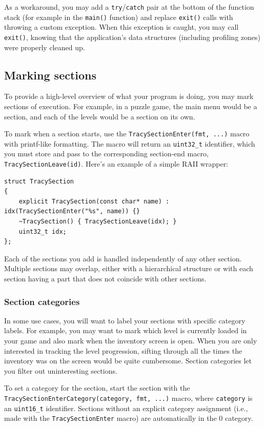\documentclass[hidelinks,titlepage,a4paper,twoside]{article}
\begin{document}
As a workaround, you may add a \texttt{try}/\texttt{catch} pair at the bottom of the function stack (for example in the \texttt{main()} function) and replace \texttt{exit()} calls with throwing a custom exception. When this exception is caught, you may call \texttt{exit()}, knowing that the application's data structures (including profiling zones) were properly cleaned up.

\subsection{Marking sections}
\label{markingsections}

To provide a high-level overview of what your program is doing, you may mark sections of execution. For example, in a puzzle game, the main menu would be a section, and each of the levels would be a section on its own.

To mark when a section starts, use the \texttt{TracySectionEnter(fmt, ...)} macro with printf-like formatting. The macro will return an \texttt{uint32\_t} identifier, which you must store and pass to the corresponding section-end macro, \texttt{TracySectionLeave(id)}. Here's an example of a simple RAII wrapper:

\begin{lstlisting}
struct TracySection
{
	explicit TracySection(const char* name) : idx(TracySectionEnter("%s", name)) {}
	~TracySection() { TracySectionLeave(idx); }
	uint32_t idx;
};
\end{lstlisting}

Each of the sections you add is handled independently of any other section. Multiple sections may overlap, either with a hierarchical structure or with each section having a part that does not coincide with other sections.

\subsubsection{Section categories}

In some use cases, you will want to label your sections with specific category labels. For example, you may want to mark which level is currently loaded in your game and also mark when the inventory screen is open. When you are only interested in tracking the level progression, sifting through all the times the inventory was on the screen would be quite cumbersome. Section categories let you filter out uninteresting sections.

To set a category for the section, start the section with the \texttt{TracySectionEnterCategory(category, fmt, ...)} macro, where \texttt{category} is an \texttt{uint16\_t} identifier. Sections without an explicit category assignment (i.e., made with the \texttt{TracySectionEnter} macro) are automatically in the $0$ category.
\end{document}
